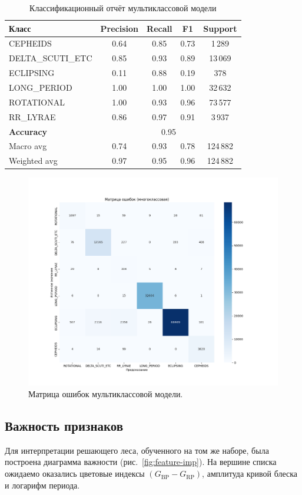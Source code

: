 \documentclass[12pt,a4paper]{article}
\begin{document}
\begin{table}[H]
    \centering
    \caption{Классификационный отчёт мультиклассовой модели}
    \label{tab:class-report}
    \begin{tabular}{lcccc}
        \toprule
        \textbf{Класс} & \textbf{Precision} & \textbf{Recall} & \textbf{F1} & \textbf{Support}\\\midrule
        CEPHEIDS & 0.64 & 0.85 & 0.73 & 1\,289\\
        DELTA\_SCUTI\_ETC & 0.85 & 0.93 & 0.89 & 13\,069\\
        ECLIPSING & 0.11 & 0.88 & 0.19 & 378\\
        LONG\_PERIOD & 1.00 & 1.00 & 1.00 & 32\,632\\
        ROTATIONAL & 1.00 & 0.93 & 0.96 & 73\,577\\
        RR\_LYRAE & 0.86 & 0.97 & 0.91 & 3\,937\\\midrule
        \textbf{Accuracy} & \multicolumn{4}{c}{0.95}\\\midrule
        Macro avg & 0.74 & 0.93 & 0.78 & 124\,882\\
        Weighted avg & 0.97 & 0.95 & 0.96 & 124\,882\\
        \bottomrule
    \end{tabular}
\end{table}

\begin{figure}[H]
    \centering
    \includegraphics[width=.55\linewidth]{multiclass_confusion_matrix.png}
    \caption{Матрица ошибок мультиклассовой модели.}
    \label{fig:cm-multiclass}
\end{figure}

\subsection{Важность признаков}
Для интерпретации решающего леса, обученного на том же наборе, была построена диаграмма важности (рис.~\ref{fig:feature-imp}). 
На вершине списка ожидаемо оказались цветовые индексы $(G_{\mathrm{BP}}-G_{\mathrm{RP}})$, амплитуда кривой блеска и логарифм периода.
\end{document}
